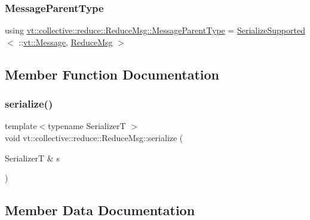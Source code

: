 \subsubsection{\texorpdfstring{Message\+Parent\+Type}{MessageParentType}}
{\footnotesize\ttfamily using \hyperlink{structvt_1_1collective_1_1reduce_1_1_reduce_msg_a5c736b83ddd821bdce047715e0b606f2}{vt\+::collective\+::reduce\+::\+Reduce\+Msg\+::\+Message\+Parent\+Type} =  \hyperlink{namespacevt_a3862b8e3f67ab03f3a4313d828592fa9}{Serialize\+Supported}$<$ \+::\hyperlink{namespacevt_a3a3ddfef40b4c90915fa43cdd5f129ea}{vt\+::\+Message}, \hyperlink{structvt_1_1collective_1_1reduce_1_1_reduce_msg}{Reduce\+Msg} $>$}



\subsection{Member Function Documentation}
\mbox{\label{structvt_1_1collective_1_1reduce_1_1_reduce_msg_acd139b8eebfbd0ea925dac39032e5717}} 
\subsubsection{\texorpdfstring{serialize()}{serialize()}}
{\footnotesize\ttfamily template$<$typename SerializerT $>$ \\
void vt\+::collective\+::reduce\+::\+Reduce\+Msg\+::serialize (\begin{DoxyParamCaption}\item[{SerializerT \&}]{s }\end{DoxyParamCaption})\hspace{0.3cm}{\ttfamily [inline]}}



\subsection{Member Data Documentation}
\mbox{\label{structvt_1_1collective_1_1reduce_1_1_reduce_msg_a1265faa9b668a8668148a97f98b75d0d}} 
